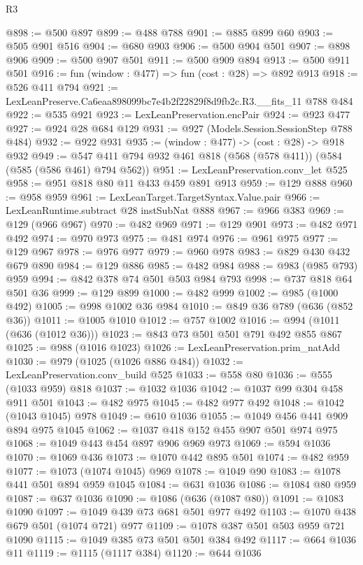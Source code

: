 \begin{lexlean}{R3}
\begin{coremodule}
@898 := @500 @897
@899 := @488 @788
@901 := @885 @899 @60
@903 := @505 @901 @516
@904 := @680 @903
@906 := @500 @904 @501
@907 := @898 @906
@909 := @500 @907 @501
@911 := @500 @909 @894
@913 := @500 @911 @501
@916 := fun (window : @477) => fun (cost : @28) => @892 @913
@918 := @526 @411 @794
@921 := LexLeanPreserve.Ca6eaa898099bc7e4b2f22829f8d9fb2c.R3.__fits_11 @788 @484
@922 := @535 @921
@923 := LexLeanPreservation.encPair
@924 := @923 @477
@927 := @924 @28 @684 @129
@931 := @927 (Models.Session.SessionStep @788 @484)
@932 := @922 @931
@935 := (window : @477) -> (cost : @28) -> @918 @932
@949 := @547 @411 @794 @932 @461 @818 (@568 (@578 @411)) (@584 (@585 (@586 @461) @794 @562))
@951 := LexLeanPreservation.conv_let @525
@958 := @951 @818 @80 @11 @433 @459 @891 @913
@959 := @129 @888
@960 := @958 @959
@961 := LexLeanTarget.TargetSyntax.Value.pair
@966 := LexLeanRuntime.subtract @28 instSubNat @888
@967 := @966 @383
@969 := @129 (@966 @967)
@970 := @482 @969
@971 := @129 @901
@973 := @482 @971 @492
@974 := @970 @973
@975 := @481 @974
@976 := @961 @975
@977 := @129 @967
@978 := @976 @977
@979 := @960 @978
@983 := @829 @430 @432 @679 @890
@984 := @129 @886
@985 := @482 @984
@988 := @983 (@985 @793) @959
@994 := @842 @378 @74 @501 @503 @984 @793
@998 := @737 @818 @64 @501 @36
@999 := @129 @899
@1000 := @482 @999
@1002 := @985 (@1000 @492)
@1005 := @998 @1002 @36 @984
@1010 := @849 @36 @789 (@636 (@852 @36))
@1011 := @1005 @1010
@1012 := @757 @1002
@1016 := @994 (@1011 (@636 (@1012 @36)))
@1023 := @843 @73 @501 @501 @791 @492 @855 @867
@1025 := @988 (@1016 @1023)
@1026 := LexLeanPreservation.prim_natAdd
@1030 := @979 (@1025 (@1026 @886 @484))
@1032 := LexLeanPreservation.conv_build @525
@1033 := @558 @80
@1036 := @555 (@1033 @959) @818
@1037 := @1032 @1036
@1042 := @1037 @99 @304 @458 @911 @501
@1043 := @482 @975
@1045 := @482 @977 @492
@1048 := @1042 (@1043 @1045) @978
@1049 := @610 @1036
@1055 := @1049 @456 @441 @909 @894 @975 @1045
@1062 := @1037 @418 @152 @455 @907 @501 @974 @975
@1068 := @1049 @443 @454 @897 @906 @969 @973
@1069 := @594 @1036
@1070 := @1069 @436
@1073 := @1070 @442 @895 @501
@1074 := @482 @959
@1077 := @1073 (@1074 @1045) @969
@1078 := @1049 @90
@1083 := @1078 @441 @501 @894 @959 @1045
@1084 := @631 @1036
@1086 := @1084 @80 @959
@1087 := @637 @1036
@1090 := @1086 (@636 (@1087 @80))
@1091 := @1083 @1090
@1097 := @1049 @439 @73 @681 @501 @977 @492
@1103 := @1070 @438 @679 @501 (@1074 @721) @977
@1109 := @1078 @387 @501 @503 @959 @721 @1090
@1115 := @1049 @385 @73 @501 @501 @384 @492
@1117 := @664 @1036 @11
@1119 := @1115 (@1117 @384)
@1120 := @644 @1036

\end{coremodule}
\end{lexlean}

